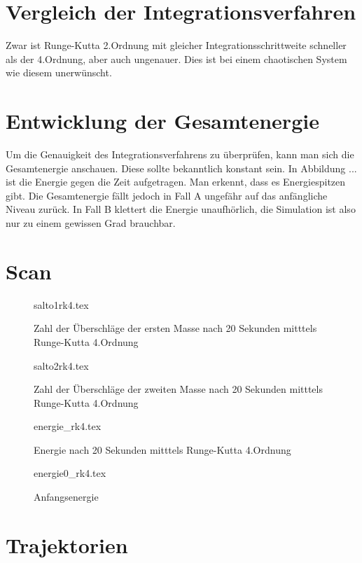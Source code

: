 \documentclass[12pt,a4paper,titlepage,headinclude,bibtotoc]{scrartcl}
\begin{document}
\section{Vergleich der Integrationsverfahren}
Zwar ist Runge-Kutta 2.Ordnung mit gleicher Integrationsschrittweite schneller als der 4.Ordnung, aber auch ungenauer. 
Dies ist bei einem chaotischen System wie diesem unerwünscht.

\section{Entwicklung der Gesamtenergie}
Um die Genauigkeit des Integrationsverfahrens zu überprüfen, kann man sich die Gesamtenergie anschauen.
Diese sollte bekanntlich konstant sein.
In Abbildung ... ist die Energie gegen die Zeit aufgetragen.
Man erkennt, dass es Energiespitzen gibt. 
Die Gesamtenergie fällt jedoch in Fall A ungefähr auf das anfängliche Niveau zurück.
In Fall B klettert die Energie unaufhörlich, die Simulation ist also nur zu einem gewissen Grad brauchbar.

\section{Scan}
\begin{figure}[!htb]
	\centering
	{salto1rk4.tex}
	\caption{Zahl der Überschläge der ersten Masse nach 20 Sekunden mitttels Runge-Kutta 4.Ordnung}
\end{figure}

\begin{figure}[!htb]
	\centering
	{salto2rk4.tex}
	\caption{Zahl der Überschläge der zweiten Masse nach 20 Sekunden mitttels Runge-Kutta 4.Ordnung}
\end{figure}

\begin{figure}[!htb]
	\centering
	{energie_rk4.tex}
	\caption{Energie nach 20 Sekunden mitttels Runge-Kutta 4.Ordnung}
\end{figure}

\begin{figure}[!htb]
	\centering
	{energie0_rk4.tex}
	\caption{Anfangsenergie}
\end{figure}

\section{Trajektorien}
\end{document}
